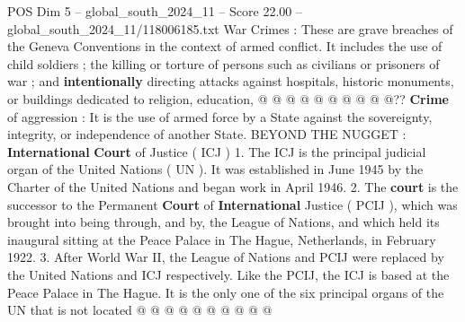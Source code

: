 \begin{textsample}{POS Dim 5 – global\_south\_2024\_11 – Score 22.00 – global\_south\_2024\_11/118006185.txt}
War Crimes : These are grave breaches of the Geneva Conventions in the context of armed conflict.
It includes the use of child soldiers ; the killing or torture of persons such as civilians or prisoners of war ; and \textbf{intentionally} directing attacks against hospitals, historic monuments, or buildings dedicated to religion, education, @ @ @ @ @ @ @ @ @ @?? \textbf{Crime} of aggression : It is the use of armed force by a State against the sovereignty, integrity, or independence of another State.
BEYOND THE NUGGET : \textbf{International} \textbf{Court} of Justice ( ICJ ) 1.
The ICJ is the principal judicial organ of the United Nations ( UN ).
It was established in June 1945 by the Charter of the United Nations and began work in April 1946. 2.
The \textbf{court} is the successor to the Permanent \textbf{Court} of \textbf{International} Justice ( PCIJ ), which was brought into being through, and by, the League of Nations, and which held its inaugural sitting at the Peace Palace in The Hague, Netherlands, in February 1922. 3.
After World War II, the League of Nations and PCIJ were replaced by the United Nations and ICJ respectively.
Like the PCIJ, the ICJ is based at the Peace Palace in The Hague.
It is the only one of the six principal organs of the UN that is not located @ @ @ @ @ @ @ @ @ @

\end{textsample}
